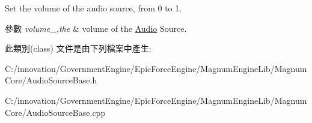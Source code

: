 Set the volume of the audio source, from 0 to 1. 


\begin{DoxyParams}{參數}
{\em volume\+\_\+,the} & volume of the \hyperlink{class_i_dream_sky_1_1_audio}{Audio} Source. \\
\hline
\end{DoxyParams}


此類別(class) 文件是由下列檔案中產生\+:\begin{DoxyCompactItemize}
\item 
C\+:/innovation/\+Government\+Engine/\+Epic\+Force\+Engine/\+Magnum\+Engine\+Lib/\+Magnum\+Core/Audio\+Source\+Base.\+h\item 
C\+:/innovation/\+Government\+Engine/\+Epic\+Force\+Engine/\+Magnum\+Engine\+Lib/\+Magnum\+Core/Audio\+Source\+Base.\+cpp\end{DoxyCompactItemize}
